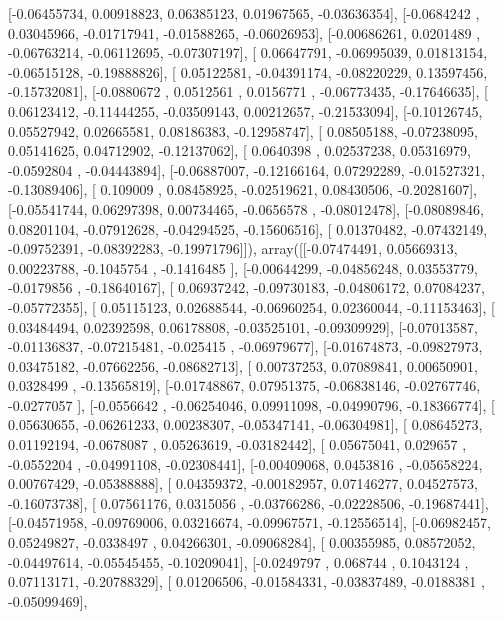 \documentclass{article}
\begin{document}
       [-0.06455734,  0.00918823,  0.06385123,  0.01967565, -0.03636354],
       [-0.0684242 ,  0.03045966, -0.01717941, -0.01588265, -0.06026953],
       [-0.00686261,  0.0201489 , -0.06763214, -0.06112695, -0.07307197],
       [ 0.06647791, -0.06995039,  0.01813154, -0.06515128, -0.19888826],
       [ 0.05122581, -0.04391174, -0.08220229,  0.13597456, -0.15732081],
       [-0.0880672 ,  0.0512561 ,  0.0156771 , -0.06773435, -0.17646635],
       [ 0.06123412, -0.11444255, -0.03509143,  0.00212657, -0.21533094],
       [-0.10126745,  0.05527942,  0.02665581,  0.08186383, -0.12958747],
       [ 0.08505188, -0.07238095,  0.05141625,  0.04712902, -0.12137062],
       [ 0.0640398 ,  0.02537238,  0.05316979, -0.0592804 , -0.04443894],
       [-0.06887007, -0.12166164,  0.07292289, -0.01527321, -0.13089406],
       [ 0.109009  ,  0.08458925, -0.02519621,  0.08430506, -0.20281607],
       [-0.05541744,  0.06297398,  0.00734465, -0.0656578 , -0.08012478],
       [-0.08089846,  0.08201104, -0.07912628, -0.04294525, -0.15606516],
       [ 0.01370482, -0.07432149, -0.09752391, -0.08392283, -0.19971796]]), array([[-0.07474491,  0.05669313,  0.00223788, -0.1045754 , -0.1416485 ],
       [-0.00644299, -0.04856248,  0.03553779, -0.0179856 , -0.18640167],
       [ 0.06937242, -0.09730183, -0.04806172,  0.07084237, -0.05772355],
       [ 0.05115123,  0.02688544, -0.06960254,  0.02360044, -0.11153463],
       [ 0.03484494,  0.02392598,  0.06178808, -0.03525101, -0.09309929],
       [-0.07013587, -0.01136837, -0.07215481, -0.025415  , -0.06979677],
       [-0.01674873, -0.09827973,  0.03475182, -0.07662256, -0.08682713],
       [ 0.00737253,  0.07089841,  0.00650901,  0.0328499 , -0.13565819],
       [-0.01748867,  0.07951375, -0.06838146, -0.02767746, -0.0277057 ],
       [-0.0556642 , -0.06254046,  0.09911098, -0.04990796, -0.18366774],
       [ 0.05630655, -0.06261233,  0.00238307, -0.05347141, -0.06304981],
       [ 0.08645273,  0.01192194, -0.0678087 ,  0.05263619, -0.03182442],
       [ 0.05675041,  0.029657  , -0.0552204 , -0.04991108, -0.02308441],
       [-0.00409068,  0.0453816 , -0.05658224,  0.00767429, -0.05388888],
       [ 0.04359372, -0.00182957,  0.07146277,  0.04527573, -0.16073738],
       [ 0.07561176,  0.0315056 , -0.03766286, -0.02228506, -0.19687441],
       [-0.04571958, -0.09769006,  0.03216674, -0.09967571, -0.12556514],
       [-0.06982457,  0.05249827, -0.0338497 ,  0.04266301, -0.09068284],
       [ 0.00355985,  0.08572052, -0.04497614, -0.05545455, -0.10209041],
       [-0.0249797 ,  0.068744  ,  0.1043124 ,  0.07113171, -0.20788329],
       [ 0.01206506, -0.01584331, -0.03837489, -0.0188381 , -0.05099469],
\end{document}
